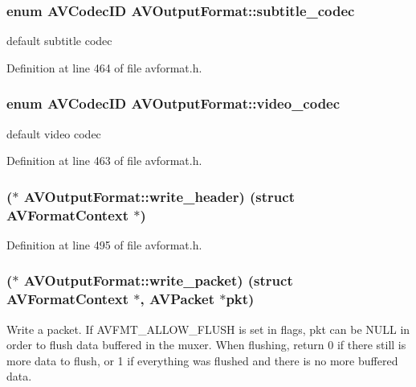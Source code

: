 \subsubsection[{\texorpdfstring{subtitle\+\_\+codec}{subtitle_codec}}]{\setlength{\rightskip}{0pt plus 5cm}enum {\bf A\+V\+Codec\+ID} A\+V\+Output\+Format\+::subtitle\+\_\+codec}\hypertarget{struct_a_v_output_format_adc8b4d7a5f6610e1816dd522e362217c}{}\label{struct_a_v_output_format_adc8b4d7a5f6610e1816dd522e362217c}
default subtitle codec 

Definition at line 464 of file avformat.\+h.

\subsubsection[{\texorpdfstring{video\+\_\+codec}{video_codec}}]{\setlength{\rightskip}{0pt plus 5cm}enum {\bf A\+V\+Codec\+ID} A\+V\+Output\+Format\+::video\+\_\+codec}\hypertarget{struct_a_v_output_format_a1354a9c8542b1b698157218336bd4754}{}\label{struct_a_v_output_format_a1354a9c8542b1b698157218336bd4754}
default video codec 

Definition at line 463 of file avformat.\+h.

\subsubsection[{\texorpdfstring{write\+\_\+header}{write_header}}]{($\ast$ A\+V\+Output\+Format\+::write\+\_\+header) (struct {\bf A\+V\+Format\+Context} $\ast$)}\hypertarget{struct_a_v_output_format_aa867a120bd90779111565907b327ba61}{}\label{struct_a_v_output_format_aa867a120bd90779111565907b327ba61}


Definition at line 495 of file avformat.\+h.

\subsubsection[{\texorpdfstring{write\+\_\+packet}{write_packet}}]{($\ast$ A\+V\+Output\+Format\+::write\+\_\+packet) (struct {\bf A\+V\+Format\+Context} $\ast$, {\bf A\+V\+Packet} $\ast$pkt)}\hypertarget{struct_a_v_output_format_a98fc78e67fc67e6f18d116ead8fb5010}{}\label{struct_a_v_output_format_a98fc78e67fc67e6f18d116ead8fb5010}
Write a packet. If A\+V\+F\+M\+T\+\_\+\+A\+L\+L\+O\+W\+\_\+\+F\+L\+U\+SH is set in flags, pkt can be N\+U\+LL in order to flush data buffered in the muxer. When flushing, return 0 if there still is more data to flush, or 1 if everything was flushed and there is no more buffered data. 

